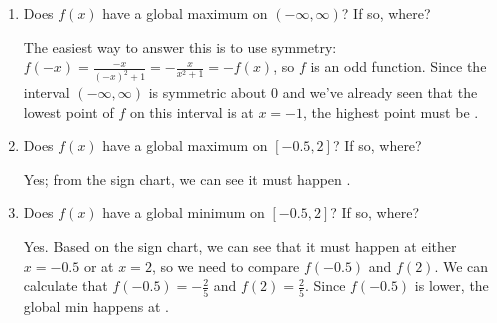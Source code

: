 \documentclass{article}
\begin{document}
\begin{enumerate}
\begin{enumerate}
  \item
    \begin{problem}[\vfill]
      Does $f(x)$ have a global maximum on $(-\infty, \infty)$?  If so,
      where?  
    \end{problem}

    \begin{solution}
      The easiest way to answer this is to use symmetry: $f(-x) = \displaystyle \frac{-x}{(-x)^2 + 1} = - \frac{x}{x^2 + 1} = - f(x)$, so $f$ is an odd function. Since the interval $(-\infty, \infty)$ is symmetric about $0$ and we've already seen that the lowest point of $f$ on this interval is at $x = - 1$, the highest point must be .
    \end{solution}

  \item
    \begin{problem}[\vfill]
      Does $f(x)$ have a global maximum on $[-0.5, 2]$?  If so, where?
    \end{problem}

    \begin{solution}
      Yes; from the sign chart, we can see it must happen .
    \end{solution}

  \item
    \begin{problem}[\stretch{0.75}]
      Does $f(x)$ have a global minimum on $[-0.5, 2]$?  If so, where?
    \end{problem}

    \begin{solution}
      Yes. Based on the sign chart, we can see that it must happen at either
      $x=-0.5$ or at $x=2$, so we need to compare $f(-0.5)$ and $f(2)$. We can
      calculate that $f(-0.5) = -\frac{2}{5}$ and $f(2) = \frac{2}{5}$. Since $f(-0.5)$
      is lower, the global min happens at .
    \end{solution}

  \end{enumerate}

\end{enumerate}
\end{document}
